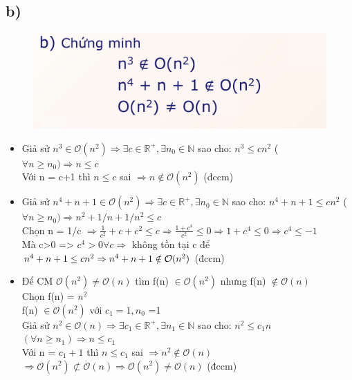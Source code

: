 \documentclass[10pt,a4paper]{article}
\begin{document}
\subsection*{b)}
\begin{figure}[H]
    \centering
    \includegraphics[scale=0.8]{images/3b.png}
\end{figure}
\begin{itemize}
    \item Giả sử $n^3 \in \mathcal{O}(n^2) \Rightarrow \exists c \in \mathbb{R^+} ,\exists n_0 \in \mathbb{N}$ sao cho: $n^3 \leq cn^2$ ($\forall n \geq n_0) \Rightarrow n \leq c$\\
    Với n = c+1 thì $n \leq c $ sai $\Rightarrow n \notin \mathcal{O}(n^2)$ (đccm)
    \item Giả sử $n^4 + n + 1 \in \mathcal{O}(n^2) \Rightarrow \exists c \in \mathbb{R^+} ,\exists n_0 \in \mathbb{N}$ sao cho: $n^4 + n + 1 \leq cn^2$ ($\forall n \geq n_0) \Rightarrow n^2 + 1/n + 1/n^2 \leq c$\\
    Chọn n = 1/c $\Rightarrow \frac{1}{c^2} + c + c^2 \leq c \Rightarrow \frac{1 + c^4}{c^2} \leq 0 \Rightarrow 1 + c^4 \leq 0 \Rightarrow c^4 \leq -1$\\
    Mà c>0 => $c^4 > 0 \forall c \Rightarrow$ không tồn tại c để $n^4 + n + 1 \leq cn^2\\ \Rightarrow n^4 + n + 1 \notin \mathcal{O}(n^2)$ (đccm)
    \item Để CM $\mathcal{O}(n^2) \ne \mathcal{O}(n)$ tìm f(n) $\in \mathcal{O}(n^2)$ nhưng f(n) $\notin \mathcal{O}(n)$\\
    Chọn f(n) = $n^2$\\
    f(n) $\in \mathcal{O}(n^2)$ với $c_1 = 1, n_0$ =1 \\Giả sử $n^2 \in \mathcal{O}(n) \Rightarrow \exists c_1 \in \mathbb{R^+} ,\exists n_1 \in \mathbb{N}$ sao cho: $n^2 \leq c_1n$ $(\forall n \geq n_1)\Rightarrow n \leq c_1$\\
    Với n = $c_1 + 1$ thì $n \leq c_1$ sai $\Rightarrow n^2 \notin \mathcal{O}(n)$\\
    $\Rightarrow \mathcal{O}(n^2) \not\subset \mathcal{O}(n)\Rightarrow \mathcal{O}(n^2) \ne  \mathcal{O}(n)$ (đccm)
\end{itemize}
\end{document}
